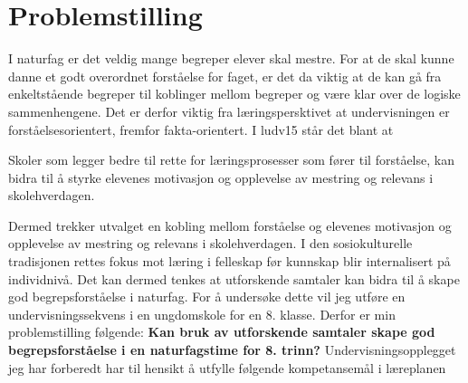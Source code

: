 \documentclass[main.tex]{subfiles}
\begin{document}
\section*{Problemstilling}

I naturfag er det veldig mange begreper elever skal mestre. For at de skal kunne danne et godt 
overordnet forståelse for faget, er det da viktig at de kan gå fra enkeltstående begreper til 
koblinger mellom begreper og være klar over de logiske sammenhengene. Det er derfor viktig fra 
læringspersktivet at undervisningen er forståelsesorientert, fremfor fakta-orientert. I \citeA
{ludv15} står det blant at
\begin{displayquote}
Skoler som legger bedre til rette for læringsprosesser som fører til forståelse, kan bidra til å 
styrke elevenes motivasjon og opplevelse av mestring og relevans i skolehverdagen.
\end{displayquote}
Dermed trekker utvalget en kobling mellom forståelse og elevenes motivasjon og opplevelse av
mestring og relevans i skolehverdagen. I den sosiokulturelle tradisjonen rettes fokus mot læring i 
felleskap før kunnskap blir internalisert på individnivå. Det kan dermed tenkes at utforskende 
samtaler kan bidra til å skape god begrepsforståelse i naturfag. For å undersøke dette vil jeg
utføre en undervisningssekvens i en ungdomskole for en 8. klasse.
\newline
\newline
Derfor er min problemstilling følgende:
\newline
\newline
\textbf{Kan bruk av utforskende samtaler skape god begrepsforståelse i en naturfagstime 
for 8. trinn?}
\newline
\newline
Undervisningsopplegget jeg har forberedt har til hensikt å utfylle følgende kompetansemål i 
læreplanen
\end{document}
